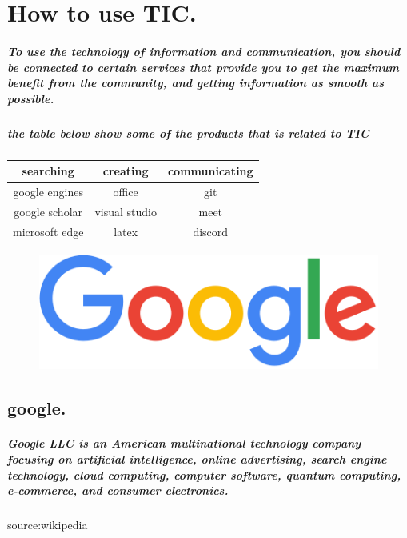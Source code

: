 \documentclass[a4paper,11pt]{report}
\begin{document}
\chapter{How to use TIC.}
\paragraph{To use the technology of information and communication, you should be connected to certain services that provide you to get the maximum benefit from the community, and getting information as smooth as possible.}

\paragraph{the table below show some of the products that is related to TIC} 


\begin{center}
\begin{tabular}{|c|c|c|}
\hline
     searching & creating & communicating \\
     \hline
     google engines & office  &  git  \\
     \hline
     google scholar & visual studio  &  meet \\
     \hline
     microsoft edge &  latex  & discord  \\
     \hline
     
\end{tabular}
\end{center}
\clearpage
\begin{figure}
    \centering
    \includegraphics[scale=0.3]{img2.png}
\end{figure}
\section{google.}
\paragraph{Google LLC is an American multinational technology company focusing on artificial intelligence, online advertising, search engine technology, cloud computing, computer software, quantum computing, e-commerce, and consumer electronics.}source:wikipedia
\end{document}
